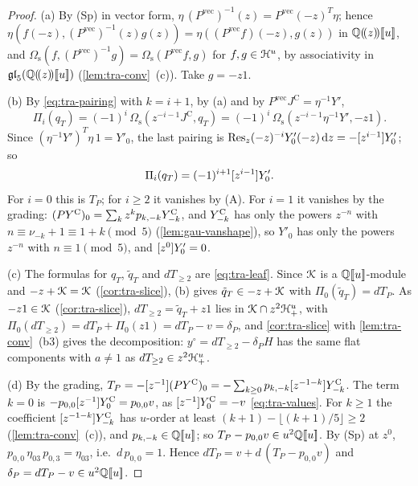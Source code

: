 \begin{proof}
(a) By (Sp) in vector form, $\eta\,(P^{\mathrm{vec}})^{-1}(z) = P^{\mathrm{vec}}(-z)^T\eta$; hence $\eta(f(-z),(P^{\mathrm{vec}})^{-1}(z)g(z)) = \eta((P^{\mathrm{vec}}f)(-z),g(z))$ in $\mathbb{Q}(\!(z)\!)[\![ u ]\!]$, and $\Omega_{\mathrm s}(f,(P^{\mathrm{vec}})^{-1}g) = \Omega_{\mathrm s}(P^{\mathrm{vec}}f,g)$ for $f,g\in\mathcal{H}^u$, by associativity in $\mathfrak{gl}_5(\mathbb{Q}(\!(z)\!)[\![ u ]\!])$ (\cref{lem:tra-conv}~(c)). Take $g = -z1$.

(b) By \eqref{eq:tra-pairing} with $k = i+1$, by (a) and by $P^{\mathrm{vec}}J^{\mathrm C} = \eta^{-1}Y'$,
\[
\Pi_i(q_T) = (-1)^i\,\Omega_{\mathrm s}(z^{-i-1}J^{\mathrm C},q_T) = (-1)^i\,\Omega_{\mathrm s}(z^{-i-1}\eta^{-1}Y',-z1).
\]
Since $(\eta^{-1}Y')^T\eta\,1 = Y'_0$, the last pairing is $\operatorname*{Res}_z(-z)^{-i}Y'_0(-z)\,\mathrm{d} z = -[z^{i-1}]Y'_0$; so
\[
\Pi_i(q_T) = (-1)^{i+1}[z^{i-1}]Y'_0 .
\]
For $i = 0$ this is $T_P$; for $i\geq 2$ it vanishes by (A). For $i = 1$ it vanishes by the grading: $(PY^{\mathrm{C}})_0 = \sum_kz^kp_{k,-k}Y^{\mathrm{C}}_{-k}$, and $Y^{\mathrm{C}}_{-k}$ has only the powers $z^{-n}$ with $n\equiv\nu_{-k}+1\equiv 1+k\pmod 5$ (\cref{lem:gau-vanshape}), so $Y'_0$ has only the powers $z^{-n}$ with $n\equiv 1\pmod 5$, and $[z^0]Y'_0 = 0$.

(c) The formulas for $q_T$, $\tilde q_T$ and $dT_{\geq 2}$ are \eqref{eq:tra-leaf}. Since $\mathcal{K}$ is a $\mathbb{Q}[\![ u ]\!]$-module and $-z+\mathcal{K} = \mathcal{K}$ (\cref{cor:tra-slice}), (b) gives $\tilde q_T\in -z+\mathcal{K}$ with $\Pi_0(\tilde q_T) = dT_P$. As $-z1\in\mathcal{K}$ (\cref{cor:tra-slice}), $dT_{\geq 2} = \tilde q_T+z1$ lies in $\mathcal{K}\cap z^2\mathcal{H}^u_+$, with $\Pi_0(dT_{\geq 2}) = dT_P+\Pi_0(z1) = dT_P-v = \delta_P$, and \cref{cor:tra-slice} with \cref{lem:tra-conv}~(b3) gives the decomposition: $y^\circ = dT_{\geq 2}-\delta_PH$ has the same flat components with $a\neq 1$ as $dT_{\geq 2}\in z^2\mathcal{H}^u_+$.

(d) By the grading, $T_P = -[z^{-1}](PY^{\mathrm{C}})_0 = -\sum_{k\geq 0}p_{k,-k}[z^{-1-k}]Y^{\mathrm{C}}_{-k}$. The term $k = 0$ is $-p_{0,0}[z^{-1}]Y^{\mathrm{C}}_0 = p_{0,0}v$, as $[z^{-1}]Y^{\mathrm{C}}_0 = -v$ \eqref{eq:tra-values}. For $k\geq 1$ the coefficient $[z^{-1-k}]Y^{\mathrm{C}}_{-k}$ has $u$-order at least $(k+1)-\lfloor(k+1)/5\rfloor\geq 2$ (\cref{lem:tra-conv}~(c)), and $p_{k,-k}\in\mathbb{Q}[\![ u ]\!]$; so $T_P-p_{0,0}v\in u^2\mathbb{Q}[\![ u ]\!]$. By (Sp) at $z^0$, $p_{0,0}\,\eta_{03}\,p_{0,3} = \eta_{03}$, i.e.\ $d\,p_{0,0} = 1$. Hence $dT_P = v+d\,(T_P-p_{0,0}v)$ and $\delta_P = dT_P-v\in u^2\mathbb{Q}[\![ u ]\!]$.
\end{proof}

